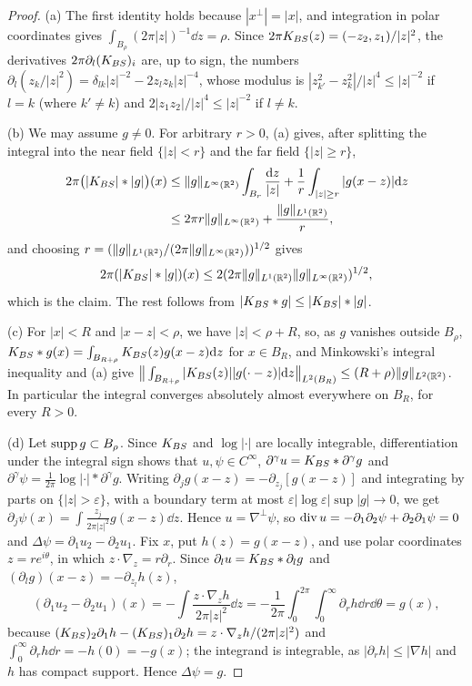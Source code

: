 \begin{proof}
(a) The first identity holds because $|x^\perp|=|x|$, and integration in polar
coordinates gives $\int_{B_\rho}(2\pi|z|)^{-1}\dd z=\rho$. Since
$2\pi K_{BS}(z)=(-z_2,z_1)/|z|^2$, the derivatives $2\pi\partial_l(K_{BS})_i$ are,
up to sign, the numbers
$\partial_l(z_k/|z|^2)=\delta_{lk}|z|^{-2}-2z_lz_k|z|^{-4}$, whose modulus is
$|z_{k'}^2-z_k^2|/|z|^4\le|z|^{-2}$ if $l=k$ (where $k'\ne k$) and
$2|z_1z_2|/|z|^4\le|z|^{-2}$ if $l\ne k$.

(b) We may assume $g\ne0$. For arbitrary $r>0$, (a) gives, after splitting the
integral into the near field $\{|z|<r\}$ and the far field $\{|z|\ge r\}$,
\[
\begin{aligned}
2\pi\big(|K_{BS}|\ast|g|\big)(x)&\le\|g\|_{L^\infty(\mathbb{R}^2)}\int_{B_r}\frac{\dd z}{|z|}
+\frac1r\int_{|z|\ge r}|g(x-z)|\dd z\\
&\le2\pi r\|g\|_{L^\infty(\mathbb{R}^2)}+\frac{\|g\|_{L^1(\mathbb{R}^2)}}{r},
\end{aligned}
\]
and choosing $r=(\|g\|_{L^1(\mathbb{R}^2)}/(2\pi\|g\|_{L^\infty(\mathbb{R}^2)}))^{1/2}$ gives
\[
2\pi(|K_{BS}|\ast|g|)(x)\le2(2\pi\|g\|_{L^1(\mathbb{R}^2)}\|g\|_{L^\infty(\mathbb{R}^2)})^{1/2},
\]
which is the claim.
The rest follows from $|K_{BS}\ast g|\le|K_{BS}|\ast|g|$.

(c) For $|x|<R$ and $|x-z|<\rho$, we have $|z|<\rho+R$, so, as $g$ vanishes
outside $B_\rho$, $K_{BS}\ast g(x)=\int_{B_{R+\rho}}K_{BS}(z)g(x-z)\dd z$ for $x\in B_R$, and Minkowski's
integral inequality and (a) give
$\big\|\int_{B_{R+\rho}}|K_{BS}(z)||g(\cdot-z)|\dd z\big\|_{L^2(B_R)}\le(R+\rho)\|g\|_{L^2(\mathbb{R}^2)}$.
In particular the integral converges absolutely almost everywhere on $B_R$, for
every $R>0$.

(d) Let $\operatorname{supp} g\subset B_\rho$. Since $K_{BS}$ and $\log|\cdot|$ are locally
integrable, differentiation under the integral sign shows that $u,\psi\in
C^\infty$, $\partial^\gamma u=K_{BS}\ast\partial^\gamma g$ and
$\partial^\gamma\psi=\frac1{2\pi}\log|\cdot|\ast\partial^\gamma g$. Writing
$\partial_jg(x-z)=-\partial_{z_j}[g(x-z)]$ and integrating by parts on
$\{|z|>\varepsilon\}$, with a boundary term at most
$\varepsilon|\log\varepsilon|\sup|g|\to0$, we get
$\partial_j\psi(x)=\int\frac{z_j}{2\pi|z|^2}g(x-z)\dd z$. Hence
$u=\nabla^\perp\psi$, so $\operatorname{div} u=-\partial_1\partial_2\psi+\partial_2\partial_1\psi=0$
and $\Delta\psi=\partial_1u_2-\partial_2u_1$. Fix $x$, put
$h(z)=g(x-z)$, and use polar coordinates $z=re^{i\theta}$, in which
$z\cdot\nabla_z=r\partial_r$.
Since $\partial_lu=K_{BS}\ast\partial_lg$ and $(\partial_lg)(x-z)=-\partial_{z_l}h(z)$,
\[
(\partial_1u_2-\partial_2u_1)(x)=-\int\frac{z\cdot\nabla_zh}{2\pi|z|^2}\dd z
=-\frac1{2\pi}\int_0^{2\pi}\!\!\int_0^\infty\partial_rh\dd r\dd\theta=g(x),
\]
because $(K_{BS})_2\partial_1h-(K_{BS})_1\partial_2h=z\cdot\nabla_zh/(2\pi|z|^2)$ and
$\int_0^\infty\partial_rh\dd r=-h(0)=-g(x)$; the integrand is integrable, as
$|\partial_rh|\le|\nabla h|$ and $h$ has compact support. Hence $\Delta\psi=g$.


\end{proof}
